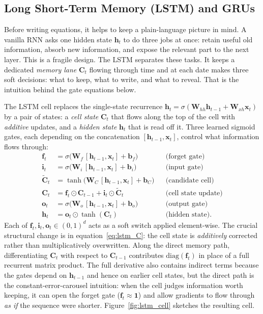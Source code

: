 \documentclass[11pt,a4paper]{report}
\newcommand{\x}{\bm{x}}
\newcommand{\h}{\bm{h}}
\newcommand{\bb}{\bm{b}}
\newcommand{\W}{\bm{W}}
\newcommand{\Wh}{\bm{W}_{hh}}
\newcommand{\Wx}{\bm{W}_{xh}}
\begin{document}
\subsection{Long Short-Term Memory (LSTM) and GRUs}
\label{sec:lstm}

Before writing equations, it helps to keep a plain-language picture in mind.  A vanilla RNN asks one hidden state $\h_t$ to do three jobs at once: retain useful old information, absorb new information, and expose the relevant part to the next layer.  This is a fragile design.  The LSTM separates these tasks.  It keeps a dedicated \emph{memory lane} $\bm{C}_t$ flowing through time and at each date makes three soft decisions: what to keep, what to write, and what to reveal.  That is the intuition behind the gate equations below.

The LSTM cell \citep{hochreiter1997long} replaces the single-state recurrence $\h_t = \sigma(\Wh\h_{t-1} + \Wx\x_t)$ by a pair of states: a \emph{cell state} $\bm{C}_t$ that flows along the top of the cell with \emph{additive} updates, and a \emph{hidden state} $\h_t$ that is read off it.  Three learned sigmoid gates, each depending on the concatenation $[\h_{t-1}, \x_t]$, control what information flows through:
\begin{align}
\bm{f}_t       &= \sigma\!\big(\W_f\,[\h_{t-1}, \x_t] + \bb_f\big) && \text{(forget gate)} \label{eq:lstm_f}\\
\bm{i}_t       &= \sigma\!\big(\W_i\,[\h_{t-1}, \x_t] + \bb_i\big) && \text{(input gate)}  \\
\tilde{\bm{C}}_t &= \tanh\!\big(\W_C\,[\h_{t-1}, \x_t] + \bb_C\big) && \text{(candidate cell)} \\
\bm{C}_t       &= \bm{f}_t \odot \bm{C}_{t-1} + \bm{i}_t \odot \tilde{\bm{C}}_t && \text{(cell state update)} \label{eq:lstm_C}\\
\bm{o}_t       &= \sigma\!\big(\W_o\,[\h_{t-1}, \x_t] + \bb_o\big) && \text{(output gate)} \\
\h_t           &= \bm{o}_t \odot \tanh(\bm{C}_t)                   && \text{(hidden state).}
\end{align}
Each of $\bm{f}_t, \bm{i}_t, \bm{o}_t \in (0,1)^{d}$ acts as a soft switch applied element-wise.  The crucial structural change is in equation~\eqref{eq:lstm_C}: the cell state is \emph{additively} corrected rather than multiplicatively overwritten.  Along the direct memory path, differentiating $\bm{C}_t$ with respect to $\bm{C}_{t-1}$ contributes $\mathrm{diag}(\bm{f}_t)$ in place of a full recurrent matrix product.  The full derivative also contains indirect terms because the gates depend on $\h_{t-1}$ and hence on earlier cell states, but the direct path is the constant-error-carousel intuition: when the cell judges information worth keeping, it can open the forget gate ($\bm{f}_t \approx \bm{1}$) and allow gradients to flow through \emph{as if} the sequence were shorter.  Figure~\ref{fig:lstm_cell} sketches the resulting cell.
\end{document}
